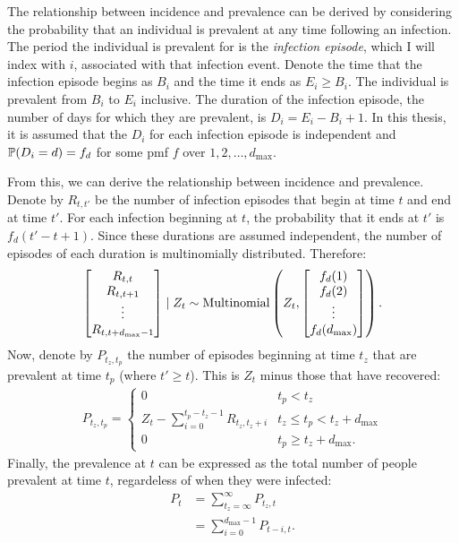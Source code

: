 \documentclass[thesis.tex]{subfiles}
\begin{document}
The relationship between incidence and prevalence can be derived by considering the probability that an individual is prevalent at any time following an infection.
The period the individual is prevalent for is the \emph{infection episode}, which I will index with $i$, associated with that infection event.
Denote the time that the infection episode begins as $B_i$ and the time it ends as $E_i \geq B_i$.
The individual is prevalent from $B_i$ to $E_i$ inclusive.
The duration of the infection episode, the number of days for which they are prevalent, is $D_i = E_i - B_i + 1$.
In this thesis, it is assumed that the $D_i$ for each infection episode is independent and $\operatorname{\mathbb{P}}(D_i = d) = f_d$ for some pmf $f$ over $1, 2, \dots, d_\text{max}$.

From this, we can derive the relationship between incidence and prevalence.
Denote by $R_{t,t'}$ be the number of infection episodes that begin at time $t$ and end at time $t'$.
For each infection beginning at $t$, the probability that it ends at $t'$ is $f_d(t' - t + 1)$.
Since these durations are assumed independent, the number of episodes of each duration is multinomially distributed.
Therefore:
\begin{align}
\begin{bmatrix}
  R_{t,t} \\ R_{t,t+1} \\ \vdots \\ R_{t,t+d_\text{max}-1}
\end{bmatrix} \mid Z_t
\sim \operatorname{Multinomial} \left(
  Z_t, 
  \begin{bmatrix}
    f_d(1) \\ f_d(2) \\ \vdots \\ f_d(d_\text{max})
  \end{bmatrix}
\right).
\end{align}
Now, denote by $P_{t_z,t_p}$ the number of episodes beginning at time $t_z$ that are prevalent at time $t_p$ (where $t' \geq t$).
This is $Z_t$ minus those that have recovered:
\begin{align}
    P_{t_z,t_p} = \begin{cases}
      0 &t_p < t_z\\
      Z_t - \sum_{i=0}^{t_p-t_z-1} R_{t_z,t_z+i} &t_z \leq t_p < t_z + d_\text{max}\\
      0 &t_p \geq t_z + d_\text{max}.
  \end{cases} \label{incprev:eq:Ptt-to-R}
\end{align}
Finally, the prevalence at $t$ can be expressed as the total number of people prevalent at time $t$, regardeless of when they were infected:
\begin{align}
  P_t
  &= \sum_{t_z=\infty}^\infty P_{t_z,t} \\
  &= \sum_{i=0}^{d_\text{max}-1} P_{t-i,t} \label{incprev:eq:Pt-to-Ptt}.
\end{align}
\end{document}
